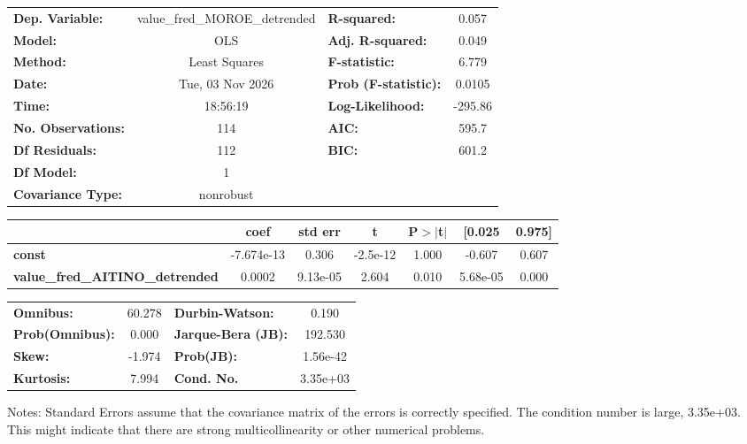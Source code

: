 \begin{center}
\begin{tabular}{lclc}
\toprule
\textbf{Dep. Variable:}                 & value\_fred\_MOROE\_detrended & \textbf{  R-squared:         } &     0.057   \\
\textbf{Model:}                         &              OLS              & \textbf{  Adj. R-squared:    } &     0.049   \\
\textbf{Method:}                        &         Least Squares         & \textbf{  F-statistic:       } &     6.779   \\
\textbf{Date:}                          &        Tue, 03 Nov 2026       & \textbf{  Prob (F-statistic):} &   0.0105    \\
\textbf{Time:}                          &            18:56:19           & \textbf{  Log-Likelihood:    } &   -295.86   \\
\textbf{No. Observations:}              &                114            & \textbf{  AIC:               } &     595.7   \\
\textbf{Df Residuals:}                  &                112            & \textbf{  BIC:               } &     601.2   \\
\textbf{Df Model:}                      &                  1            & \textbf{                     } &             \\
\textbf{Covariance Type:}               &           nonrobust           & \textbf{                     } &             \\
\bottomrule
\end{tabular}
\begin{tabular}{lcccccc}
                                        & \textbf{coef} & \textbf{std err} & \textbf{t} & \textbf{P$> |$t$|$} & \textbf{[0.025} & \textbf{0.975]}  \\
\midrule
\textbf{const}                          &   -7.674e-13  &        0.306     &  -2.5e-12  &         1.000        &       -0.607    &        0.607     \\
\textbf{value\_fred\_AITINO\_detrended} &       0.0002  &     9.13e-05     &     2.604  &         0.010        &     5.68e-05    &        0.000     \\
\bottomrule
\end{tabular}
\begin{tabular}{lclc}
\textbf{Omnibus:}       & 60.278 & \textbf{  Durbin-Watson:     } &    0.190  \\
\textbf{Prob(Omnibus):} &  0.000 & \textbf{  Jarque-Bera (JB):  } &  192.530  \\
\textbf{Skew:}          & -1.974 & \textbf{  Prob(JB):          } & 1.56e-42  \\
\textbf{Kurtosis:}      &  7.994 & \textbf{  Cond. No.          } & 3.35e+03  \\
\bottomrule
\end{tabular}
\end{center}

Notes: \newline
 [1] Standard Errors assume that the covariance matrix of the errors is correctly specified. \newline
 [2] The condition number is large, 3.35e+03. This might indicate that there are \newline
 strong multicollinearity or other numerical problems.